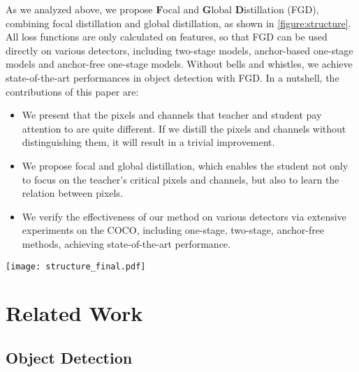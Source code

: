 \documentclass[10pt,twocolumn,letterpaper]{article}
\begin{document}
As we analyzed above, we propose \textbf{F}ocal and \textbf{G}lobal \textbf{D}istillation (FGD), combining focal distillation and global distillation, as shown in  \cref{figure:structure}. All loss functions are only calculated on features, so that FGD can be used directly on various detectors, including two-stage models, anchor-based one-stage models and anchor-free one-stage models. Without bells and whistles, we achieve state-of-the-art performances in object detection with FGD. In a nutshell, the contributions of this paper are:

\begin{itemize}
  \item
  We present that the pixels and channels that teacher and student pay attention to are quite different. If we distill the pixels and channels without distinguishing them, it will result in a trivial improvement.
  \item
  We propose focal and global distillation, which enables the student not only to focus on the teacher's critical pixels and channels, but also to learn the relation between pixels.
  \item
  We verify the effectiveness of our method on various detectors via extensive experiments on the COCO\cite{lin2014microsoft}, including one-stage, two-stage, anchor-free methods, achieving state-of-the-art performance.
\end{itemize}

\begin{figure*}
  \centering
  \texttt{[image: structure\_final.pdf]}
  \caption{An illustration of FGD, including focal distillation and global distillation. Focal distillation not only separates the foreground and the background, but also enables the student network to better pay attention to the important information in the teacher network's feature map. Global distillation bridges the gap between the global context of the student and the teacher.}
  \label{figure:structure}
\end{figure*}

\section{Related Work}
\label{sec:related work}

\subsection{Object Detection}
\end{document}
